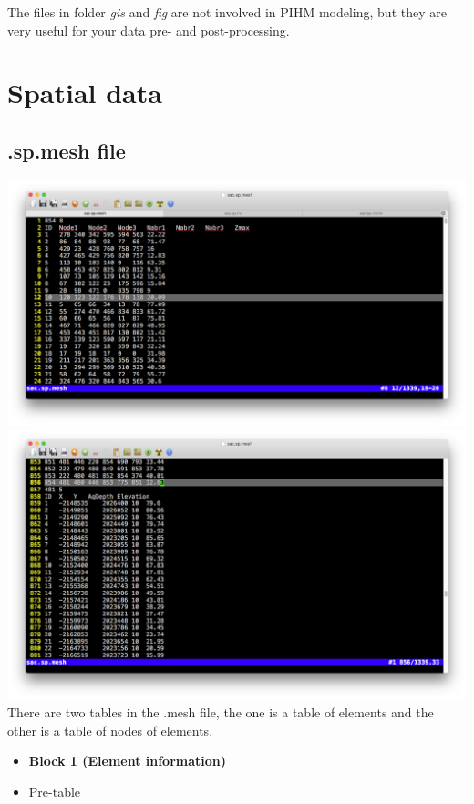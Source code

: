\documentclass[]{scrbook}
\begin{document}
The files in folder \emph{gis} and \emph{fig} are not involved in PIHM
modeling, but they are very useful for your data pre- and
post-processing.

\section{Spatial data}\label{spatial-data}

\subsection{.sp.mesh file}\label{sp.mesh-file}

\includegraphics{Fig/IO/sp.mesh1.png}
\includegraphics{Fig/IO/sp.mesh2.png} There are two tables in the .mesh
file, the one is a table of elements and the other is a table of nodes
of elements.

\begin{itemize}
\item
  \textbf{Block 1 (Element information)}
\item
  Pre-table
\end{itemize}
\end{document}
